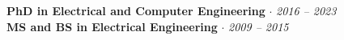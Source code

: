 \documentclass[11pt]{article}
\begin{document}
\textbf{ PhD in Electrical and Computer Engineering} \enskip $\cdot$  \hfill \textit{\footnotesize 2016 -- 2023} \\
\textbf{ MS and BS in Electrical Engineering} \enskip $\cdot$  \hfill \textit{\footnotesize 2009 -- 2015}

 


\end{document}
